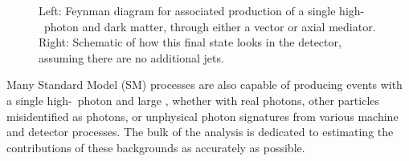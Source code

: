 \begin{figure}[htbp]
  \centering
  \caption{
    Left: Feynman diagram for associated production of a single high-\pt\ photon and dark matter, through either a vector or axial mediator.
    Right: Schematic of how this final state looks in the detector, assuming there are no additional jets.
    }
    \label{fig:photonmet}
\end{figure}

Many Standard Model (SM) processes are also capable of producing events with a single high-\pt\ photon and large \met, whether with real photons, other particles misidentified as photons, or unphysical photon signatures from various  machine and detector processes.
The bulk of the analysis is dedicated to estimating the contributions of these backgrounds as accurately as possible. 

